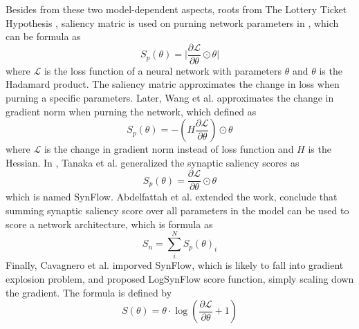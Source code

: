 \documentclass[sigconf]{acmart}
\begin{document}
    Besides from these two model-dependent aspects, roots from The Lottery Ticket Hypothesis 
    \cite{frankle2019lottery}, saliency matric is used on purning network parameters in 
    \cite{lee2019snip}, which can be formula as 
    \begin{equation}
        \label{equ:snip}
        S_p(\theta)=\lvert\frac{\partial \mathcal L}{\partial \theta}\odot\theta\rvert
    \end{equation}
    where $\mathcal L$ is the loss function of a neural network with parameters $\theta$ 
    and $\theta$ is the Hadamard product. 
    The saliency matric approximates the change in loss when purning a specific parameters.
    Later, Wang et al. \cite{wang2020picking} approximates the change in gradient norm when 
    purning the network, which defined as 
    \begin{equation}
        \label{equ:grap}
        S_p(\theta)=-(H\frac{\partial \mathcal L}{\partial \theta})\odot\theta
    \end{equation}
    where $\mathcal L$ is the change in gradient norm instead of loss function and $H$ is 
    the Hessian. 
    In \cite{tanaka2020pruning}, Tanaka et al. generalized the synaptic saliency scores as 
    \begin{equation}
        \label{equ:synflow}
        S_p(\theta)=\frac{\partial \mathcal L}{\partial \theta}\odot\theta
    \end{equation}
    which is named SynFlow. 
    Abdelfattah et al. \cite{abdelfattah2021zerocost} extended the work, conclude that summing 
    synaptic saliency score over all parameters in the model can be used to score a network 
    architecture, which is formula as
    \begin{equation}
        \label{equ:zero_cost}
        S_n=\sum^N_i S_p(\theta)_i
    \end{equation}
    Finally, Cavagnero et al. \cite{Cavagnero_2023} imporved SynFlow, which is likely to fall into 
    gradient explosion problem, and proposed LogSynFlow score function, simply scaling down the gradient. 
    The formula is defined by 
    \begin{equation}
        \label{equ:logsynflow}
        S(\theta)=\theta\cdot\log(\frac{\partial \mathcal L}{\partial \theta}+1)
    \end{equation}
\end{document}
